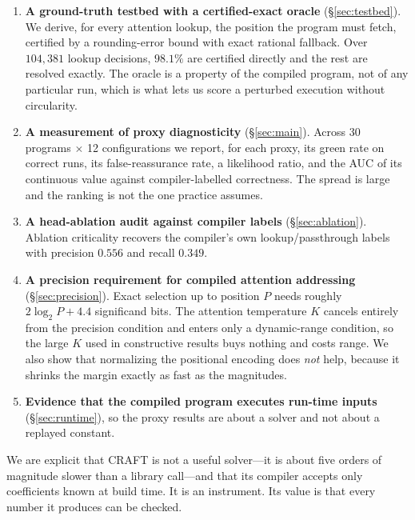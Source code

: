 \documentclass{article}
\theoremstyle{definition}
\begin{document}
\begin{enumerate}
\item \textbf{A ground-truth testbed with a certified-exact oracle}
(\S\ref{sec:testbed}). We derive, for every attention lookup, the position the
program must fetch, certified by a rounding-error bound with exact rational
fallback. Over $104{,}381$ lookup decisions, $98.1\%$ are certified directly and
the rest are resolved exactly. The oracle is a property of the compiled program,
not of any particular run, which is what lets us score a perturbed execution
without circularity.

\item \textbf{A measurement of proxy diagnosticity} (\S\ref{sec:main}). Across 30
programs $\times$ 12 configurations we report, for each proxy, its green rate on
correct runs, its false-reassurance rate, a likelihood ratio, and the AUC of its
continuous value against compiler-labelled correctness. The spread is large and
the ranking is not the one practice assumes.

\item \textbf{A head-ablation audit against compiler labels}
(\S\ref{sec:ablation}). Ablation criticality recovers the compiler's own
lookup/passthrough labels with precision $0.556$ and recall $0.349$.

\item \textbf{A precision requirement for compiled attention addressing}
(\S\ref{sec:precision}). Exact selection up to position $P$ needs roughly
$2\log_2 P + 4.4$ significand bits. The attention temperature $K$ cancels
entirely from the precision condition and enters only a dynamic-range condition,
so the large $K$ used in constructive results buys nothing and costs range. We
also show that normalizing the positional encoding does \emph{not} help, because
it shrinks the margin exactly as fast as the magnitudes.

\item \textbf{Evidence that the compiled program executes run-time inputs}
(\S\ref{sec:runtime}), so the proxy results are about a solver and not about a
replayed constant.
\end{enumerate}

We are explicit that CRAFT is not a useful solver---it is about five orders of
magnitude slower than a library call---and that its compiler accepts only
coefficients known at build time. It is an instrument. Its value is that every
number it produces can be checked.

\end{document}
